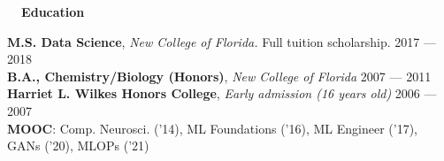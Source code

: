 \documentclass[a4paper,12pt]{article}
\newcommand{\resheading}[1]{{\vspace*{.001in} \colorbox{mygrey}{\begin{minipage}{\textwidth}{\textmd{\large \textbf{#1} \vphantom{p\^{E}}}}\end{minipage}}} }
\newcommand{\ressubheading}[4]{
    \textbf{#1} \hfill #2\\
    \textit{#3} \hfill #4 \\}
\begin{document}


    \resheading{~~Education}

    \textbf{M.S. Data Science}, \textit{New College of Florida.} Full tuition scholarship. \hfill 2017 --- 2018\\
    \textbf{B.A., Chemistry/Biology (Honors)}, \textit{New College of Florida} \hfill 2007 --- 2011\\
    \textbf{Harriet L. Wilkes Honors College}, \textit{Early admission (16 years old)} \hfill 2006 --- 2007\\
    \textbf{MOOC}: Comp. Neurosci. ('14), ML Foundations ('16), ML Engineer ('17), GANs ('20), MLOPs ('21)
\end{document}
